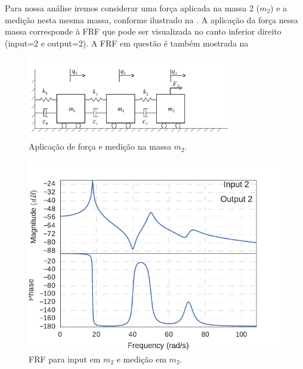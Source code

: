 Para nossa análise iremos considerar uma força aplicada na massa 2 ($m_2$) e a medição nesta mesma massa, conforme ilustrado na . A aplicação da força nessa massa corresponde à FRF que pode ser visualizada no canto inferior direito (input=2 e output=2). A FRF em questão é também mostrada na 

\begin{figure}
	\centering
	\includegraphics[width=0.8\textwidth]{IMGS/sistemaf}
	\caption{Aplicação de força e medição na massa $m_2$.}
	\label{fig:sistemaf}
\end{figure}

\begin{figure}
	\centering
	\includegraphics[scale=1]{IMGS/FRF_i2_o2}
	\caption{FRF para input em $m_2$ e medição em $m_2$.}
	\label{fig:FRF_i2_o2}
\end{figure}



